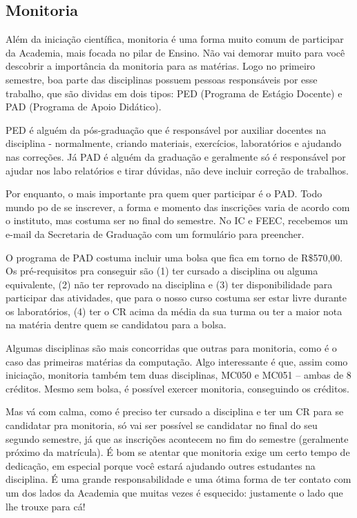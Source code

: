 \subsection{Monitoria}

Além da iniciação científica, monitoria é uma forma muito comum de participar da  Academia, mais focada no pilar de Ensino. Não vai demorar muito para você descobrir a  importância da monitoria para as matérias. Logo no primeiro semestre, boa parte das  disciplinas possuem pessoas responsáveis por esse trabalho, que são dividas em dois  tipos: PED (Programa de Estágio Docente) e PAD (Programa de Apoio Didático).

PED é alguém da pós-graduação que é responsável por auxiliar docentes na disciplina - normalmente, criando materiais, exercícios, laboratórios e ajudando nas correções.  Já PAD é alguém da graduação e geralmente só é responsável por ajudar nos labo relatórios e tirar dúvidas, não deve incluir correção de trabalhos.

Por enquanto, o mais importante pra quem quer participar é o PAD. Todo mundo po de se inscrever, a forma e momento das inscrições varia de acordo com o instituto, mas  costuma ser no final do semestre. No IC e FEEC, recebemos um e-mail da Secretaria de  Graduação com um formulário para preencher.

O programa de PAD costuma incluir uma bolsa que fica em torno de R\$570,00. Os  pré-requisitos pra conseguir são (1) ter cursado a disciplina ou alguma equivalente, (2)  não ter reprovado na disciplina e (3) ter disponibilidade para participar das atividades,  que para o nosso curso costuma ser estar livre durante os laboratórios, (4) ter o CR  acima da média da sua turma ou ter a maior nota na matéria dentre quem se candidatou  para a bolsa.

Algumas disciplinas são mais concorridas que outras para monitoria, como é o caso  das primeiras matérias da computação. Algo interessante é que, assim como iniciação,  monitoria também tem duas disciplinas, MC050 e MC051 – ambas de 8 créditos. Mesmo  sem bolsa, é possível exercer monitoria, conseguindo os créditos. 

Mas vá com calma, como é preciso ter cursado a disciplina e ter um CR para se  candidatar pra monitoria, só vai ser possível se candidatar no final do seu segundo  semestre, já que as inscrições acontecem no fim do semestre (geralmente próximo da  matrícula). É bom se atentar que monitoria exige um certo tempo de dedicação, em  especial porque você estará ajudando outres estudantes na disciplina. É uma grande  responsabilidade e uma ótima forma de ter contato com um dos lados da Academia que  muitas vezes é esquecido: justamente o lado que lhe trouxe para cá!

